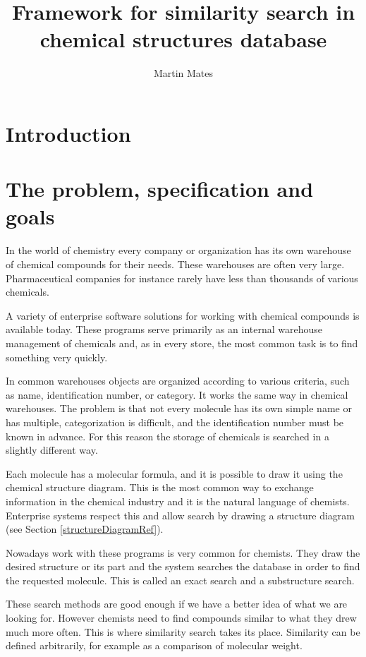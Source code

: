 \documentclass[thesis=M,english]{FITthesis}[2012/10/20]
\title{Framework for similarity search in chemical structures database}
\author{Martin Mates} %
\begin{document}

\chapter{Introduction}



\chapter{The problem, specification and goals}
In the world of chemistry every company or organization has its own warehouse of chemical compounds for their needs. These warehouses are often very large. Pharmaceutical companies for instance rarely have less than thousands of various chemicals.

A variety of enterprise software solutions for working with chemical compounds is available today. These programs serve primarily as an internal warehouse management of chemicals and, as in every store, the most common task is to find something very quickly.

In common warehouses objects are organized according to various criteria, such as name, identification number, or category. It works the same way in chemical warehouses. The problem is that not every molecule has its own simple name or has multiple, categorization is difficult, and the identification number must be known in advance. For this reason the storage of chemicals is searched in a slightly different way.

Each molecule has a molecular formula, and it is possible to draw it using the chemical structure diagram. This is the most common way to exchange information in the chemical industry and it is the natural language of chemists. Enterprise systems respect this and allow search by drawing a structure diagram (see Section \ref{structureDiagramRef}).

Nowadays work with these programs is very common for chemists. They draw the desired structure or its part and the system searches the database in order to find the requested molecule. This is called an exact search and a substructure search.

These search methods are good enough if we have a better idea of what we are looking for. However chemists need to find compounds similar to what they drew much more often. This is where similarity search takes its place. Similarity can be defined arbitrarily, for example as a comparison of molecular weight.
\end{document}
